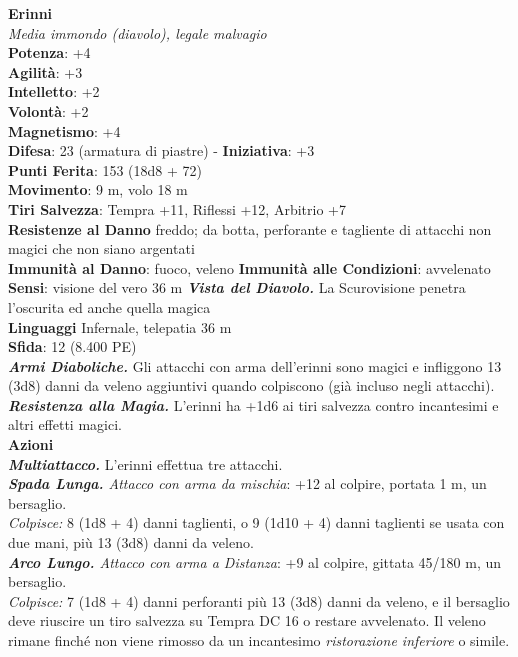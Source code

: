 \begin{multicols}{2}
\medskip\textbf{Erinni}\\
\emph{Media immondo (diavolo), legale malvagio}\\
\textbf{Potenza}: +4\\
\textbf{Agilità}: +3\\
\textbf{Intelletto}: +2\\
\textbf{Volontà}: +2\\
\textbf{Magnetismo}: +4\\
\textbf{Difesa}: 23 (armatura di piastre) - \textbf{Iniziativa}: +3\\
\textbf{Punti Ferita}: 153 (18d8 + 72)\\
\textbf{Movimento}: 9 m, volo 18 m\\
\textbf{Tiri Salvezza}: Tempra +11, Riflessi +12, Arbitrio +7\\
\textbf{Resistenze al Danno} freddo; da botta, perforante e tagliente di attacchi non magici che non siano argentati\\
\textbf{Immunità al Danno}: fuoco, veleno
\textbf{Immunità alle Condizioni}: avvelenato\\
\textbf{Sensi}: visione del vero 36 m
\emph{\textbf{Vista del Diavolo.}} La Scurovisione penetra l'oscurita ed anche quella magica\\
\textbf{Linguaggi} Infernale, telepatia 36 m \\
\textbf{Sfida}: 12 (8.400 PE)\smallskip\\
\emph{\textbf{Armi Diaboliche.}} Gli attacchi con arma dell'erinni sono magici e infliggono 13 (3d8) danni da veleno aggiuntivi quando colpiscono (già incluso negli attacchi).\\
\emph{\textbf{Resistenza alla Magia.}} L'erinni ha +1d6 ai tiri salvezza contro incantesimi e altri effetti magici.\\
\smallskip\textbf{Azioni}\\
\emph{\textbf{Multiattacco.}} L'erinni effettua tre attacchi.\\
\emph{\textbf{Spada Lunga.} Attacco con arma da mischia}: +12 al colpire, portata 1 m, un bersaglio.\\
\emph{Colpisce:} 8 (1d8 + 4) danni taglienti, o 9 (1d10 + 4) danni taglienti se usata con due mani, più 13 (3d8) danni da veleno. \\
\emph{\textbf{Arco Lungo.} Attacco con arma a Distanza}: +9 al colpire, gittata 45/180 m, un bersaglio. \\
\emph{Colpisce:} 7 (1d8 + 4) danni perforanti più 13 (3d8) danni da veleno, e il bersaglio deve riuscire un tiro salvezza su Tempra DC  16 o restare avvelenato. Il veleno rimane finché non viene rimosso da un incantesimo \emph{ristorazione inferiore} o simile.\\

\end{multicols}
